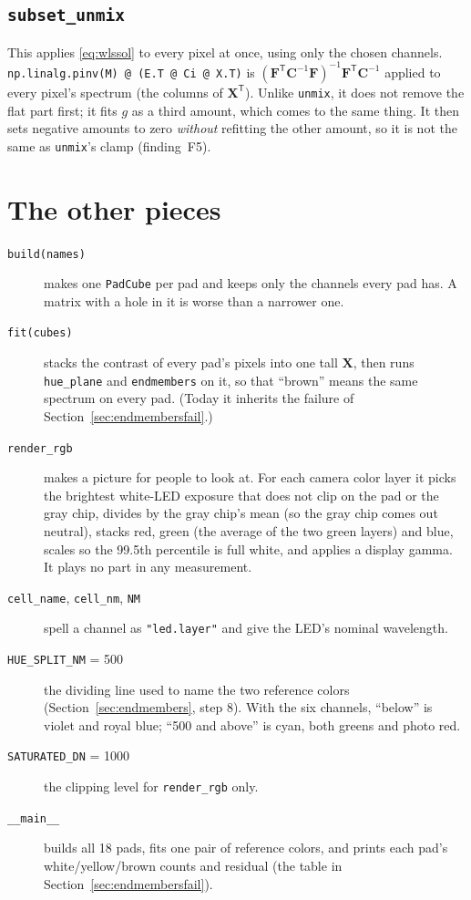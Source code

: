 \documentclass[11pt,letterpaper]{article}
\newcommand{\code}[1]{\texttt{#1}}
\newcommand{\mX}{\mathbf{X}}
\newcommand{\mF}{\mathbf{F}}
\newcommand{\mC}{\mathbf{C}}
\newcommand{\T}{^{\mathsf{T}}}
\newcommand{\inv}{^{-1}}
\newcommand{\src}[3]{%
  }
\begin{document}
\subsection{\code{subset\_unmix}}

\src{648}{663}{The body of \code{subset\_unmix}.}

This applies \eqref{eq:wlssol} to every pixel at once, using only the chosen
channels.  \code{np.linalg.pinv(M) @ (E.T @ Ci @ X.T)} is
$(\mF\T\mC\inv\mF)\inv\mF\T\mC\inv$ applied to every pixel's spectrum (the
columns of $\mX\T$).  Unlike \code{unmix}, it does not remove the flat part
first; it fits $g$ as a third amount, which comes to the same thing.  It then
sets negative amounts to zero \emph{without} refitting the other amount, so
it is not the same as \code{unmix}'s clamp (finding~F5).

\section{The other pieces}
\label{sec:helpers}

\begin{description}
\item[\code{build(names)}] makes one \code{PadCube} per pad and keeps only
  the channels every pad has.  A matrix with a hole in it is worse than a
  narrower one.
\item[\code{fit(cubes)}] stacks the contrast of every pad's pixels into one
  tall $\mX$, then runs \code{hue\_plane} and \code{endmembers} on it, so
  that ``brown'' means the same spectrum on every pad.  (Today it inherits
  the failure of Section~\ref{sec:endmembersfail}.)
\item[\code{render\_rgb}] makes a picture for people to look at.  For each
  camera color layer it picks the brightest white-LED exposure that does not
  clip on the pad or the gray chip, divides by the gray chip's mean (so the
  gray chip comes out neutral), stacks red, green (the average of the two
  green layers) and blue, scales so the 99.5th percentile is full white, and
  applies a display gamma.  It plays no part in any measurement.
\item[\code{cell\_name}, \code{cell\_nm}, \code{NM}] spell a channel as
  \code{"led.layer"} and give the LED's nominal wavelength.
\item[\code{HUE\_SPLIT\_NM} = 500] the dividing line used to name the two
  reference colors (Section~\ref{sec:endmembers}, step 8).  With the six
  channels, ``below'' is violet and royal blue; ``500 and above'' is cyan,
  both greens and photo red.
\item[\code{SATURATED\_DN} = 1000] the clipping level for
  \code{render\_rgb} only.
\item[\code{\_\_main\_\_}] builds all 18 pads, fits one pair of reference
  colors, and prints each pad's white/yellow/brown counts and residual
  (the table in Section~\ref{sec:endmembersfail}).
\end{description}
\end{document}
